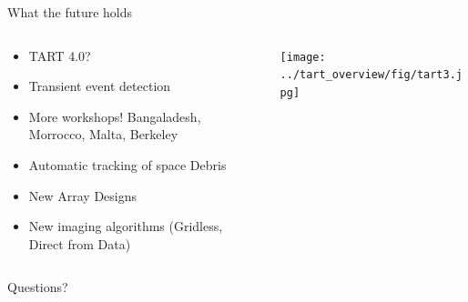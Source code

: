 \documentclass[ignorenonframetext]{beamer}
\begin{document}
\begin{frame}{What the future holds}
 \begin{columns}
  \begin{column}{0.6\linewidth}
    \begin{itemize}
    \item TART 4.0?
    \item Transient event detection
    \item More workshops! Bangaladesh, Morrocco, Malta, Berkeley
    \item Automatic tracking of space Debris
    \item New Array Designs
    \item New imaging algorithms (Gridless, Direct from Data)
    \end{itemize}
  \end{column}
  \begin{column}{0.4\linewidth}
    \texttt{[image: ../tart\_overview/fig/tart3.jpg]}
  \end{column}
\end{columns}
    \pause
    \begin{block}{}
     \begin{center} Questions? \end{center}
    \end{block}

\end{frame}
\end{document}
